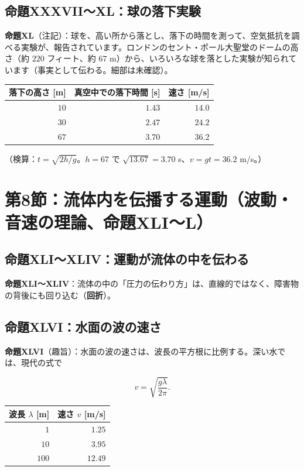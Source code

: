 \documentclass[a4paper,11pt,openany]{ltjsbook}
\begin{document}
\subsection{命題XXXVII〜XL：球の落下実験}

\textbf{命題XL}（注記）：球を、高い所から落とし、落下の時間を測って、空気抵抗を調べる実験が、報告されています。ロンドンのセント・ポール大聖堂のドームの高さ（約 $220$ フィート、約 $67$ m）から、いろいろな球を落とした実験が知られています（事実として伝わる。細部は未確認）。

\begin{center}
\begin{tabular}{rrr}
\toprule
落下の高さ [m] & 真空中での落下時間 [s] & 速さ [m/s]\\
\midrule
$10$ & $1.43$ & $14.0$\\
$30$ & $2.47$ & $24.2$\\
$67$ & $3.70$ & $36.2$\\
\bottomrule
\end{tabular}
\end{center}

（検算：$t=\sqrt{2h/g}$。$h=67$ で $\sqrt{13.67}=3.70$ s、$v=gt=36.2$ m/s。）

\section{第8節：流体内を伝播する運動（波動・音速の理論、命題XLI〜L）}

\subsection{命題XLI〜XLIV：運動が流体の中を伝わる}

\textbf{命題XLI〜XLIV}：流体の中の「圧力の伝わり方」は、直線的ではなく、障害物の背後にも回り込む（\textbf{回折}）。

\subsection{命題XLVI：水面の波の速さ}

\textbf{命題XLVI}（趣旨）：水面の波の速さは、波長の平方根に比例する。深い水では、現代の式で

\[
v=\sqrt{\frac{g\lambda}{2\pi}}.
\]

\begin{center}
\begin{tabular}{rr}
\toprule
波長 $\lambda$ [m] & 速さ $v$ [m/s]\\
\midrule
$1$ & $1.25$\\
$10$ & $3.95$\\
$100$ & $12.49$\\
\bottomrule
\end{tabular}
\end{center}
\end{document}
